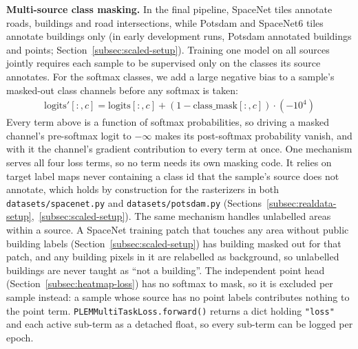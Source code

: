 \textbf{Multi-source class masking.} In the final pipeline, SpaceNet tiles annotate roads,
buildings and road intersections, while Potsdam and SpaceNet6 tiles annotate buildings only (in
early development runs, Potsdam annotated buildings and points; Section~\ref{subsec:scaled-setup}).
Training one model on all sources jointly requires each sample to be supervised only on the classes
its source annotates. For the softmax classes, we add a large negative bias to a sample's
masked-out class channels before any softmax is taken:
\begin{align}
  \mathrm{logits}'[:,c] = \mathrm{logits}[:,c] + (1 - \mathrm{class\_mask}[:,c]) \cdot (-10^4)
\end{align}
Every term above is a function of softmax probabilities, so driving a masked channel's pre-softmax
logit to $-\infty$ makes its post-softmax probability vanish, and with it the channel's gradient
contribution to every term at once. One mechanism serves all four loss terms, so no term needs its
own masking code. It relies on target label maps never containing a class id that the sample's
source does not annotate, which holds by construction for the rasterizers in both
\texttt{datasets/spacenet.py} and \texttt{datasets/potsdam.py}
(Sections~\ref{subsec:realdata-setup},~\ref{subsec:scaled-setup}). The same mechanism handles
unlabelled areas within a source. A SpaceNet training patch that touches any area without public
building labels (Section~\ref{subsec:scaled-setup}) has building masked out for that patch, and any
building pixels in it are relabelled as background, so unlabelled buildings are never taught as
``not a building''. The independent point head (Section~\ref{subsec:heatmap-loss}) has no softmax
to mask, so it is excluded per sample instead: a sample whose source has no point labels
contributes nothing to the point term. \texttt{PLEMMultiTaskLoss.forward()} returns a dict holding
\texttt{"loss"} and each active sub-term as a detached float, so every sub-term can be logged per
epoch.
